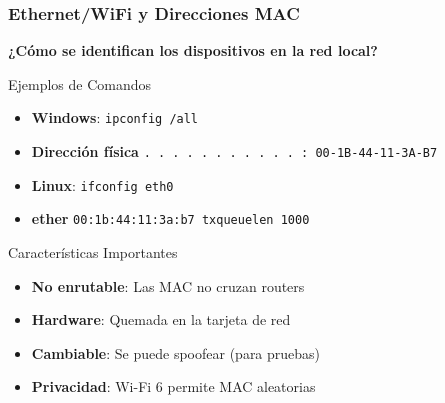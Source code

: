 \documentclass[aspectratio=169]{beamer}
\begin{document}
    \begin{frame}
      \frametitle{Ethernet/WiFi y Direcciones MAC}
      
      \begin{center}
      \Large \textbf{¿Cómo se identifican los dispositivos en la red local?}
      \end{center}  
      \begin{block}{Ejemplos de Comandos}
        \begin{itemize}
        \item \textbf{Windows}: \texttt{ipconfig /all}
        \item \textbf{Dirección física} \texttt{. . . . . . . . . . . : 00-1B-44-11-3A-B7}
        \item \textbf{Linux}: \texttt{ifconfig eth0}
        \item \textbf{ether} \texttt{00:1b:44:11:3a:b7  txqueuelen 1000}
      \end{itemize}
      \end{block}
      
      \begin{block}{Características Importantes}
      \begin{itemize}
      \item \textbf{No enrutable}: Las MAC no cruzan routers
      \item \textbf{Hardware}: Quemada en la tarjeta de red
      \item \textbf{Cambiable}: Se puede spoofear (para pruebas)
      \item \textbf{Privacidad}: Wi-Fi 6 permite MAC aleatorias
      \end{itemize}
      \end{block}
      \end{frame}
\end{document}
